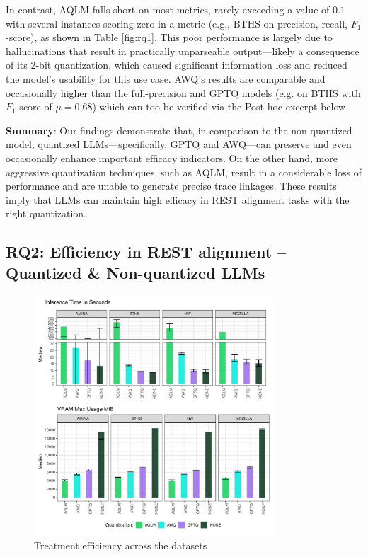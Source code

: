 \documentclass[conference]{IEEEtran}
\begin{document}



In contrast, AQLM falls short on most metrics, rarely exceeding a value of $0.1$ with several instances scoring zero in a metric (e.g., BTHS on precision, recall, $F_1$-score), as shown in Table \ref{fig:rq1}. This poor performance is largely due to hallucinations that result in practically unparseable output---likely a consequence of its 2-bit quantization, which caused significant information loss and reduced the model's usability for this use case. AWQ's results are comparable and occasionally higher than the full-precision and GPTQ models (e.g. on BTHS with $F_1$-score of $\mu = 0.68$) which can too be verified via the Post-hoc excerpt below.




\textbf{Summary}: Our findings demonstrate that, in comparison to the non-quantized model, quantized LLMs---specifically, GPTQ and AWQ---can preserve and even occasionally enhance important efficacy indicators.  On the other hand, more aggressive quantization techniques, such as AQLM, result in a considerable loss of performance and are unable to generate precise trace linkages. These results imply that LLMs can maintain high efficacy in REST alignment tasks with the right quantization.

\subsection{\textbf{RQ2:} Efficiency in REST alignment -- Quantized \& Non-quantized LLMs}

\begin{figure}[h!]
    \centering
    \includegraphics[width=0.8\textwidth]{images/RQ2.pdf}
    \caption{Treatment efficiency across the datasets}
    \label{fig:rq2}
\end{figure}
\end{document}
